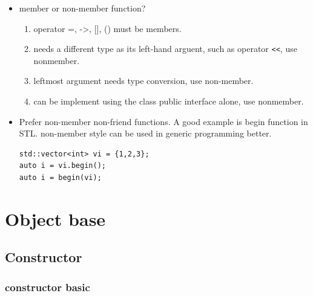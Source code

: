 \documentclass[a4paper,11pt,twoside]{book}
\begin{document}
\begin{itemize}
	\item member or non-member function?
	\begin{enumerate}
		\item operator =, ->, [], () must be members.
		\item needs a different type as its left-hand arguent, such as operator \verb=<<=, use nonmember.
		\item leftmost argument needs type conversion, use non-member.
		\item can be implement using the class public interface alone, use nonmember.
	\end{enumerate}

	\item Prefer non-member non-friend functions. A good example is begin function in STL. non-member style can be used in generic programming better.  

\begin{lstlisting}[numbers=none]
std::vector<int> vi = {1,2,3};
auto i = vi.begin();
auto i = begin(vi);
\end{lstlisting}
	
\end{itemize}

\section{Object base}
\subsection{Constructor}

\subsubsection{constructor basic}
\end{document}

